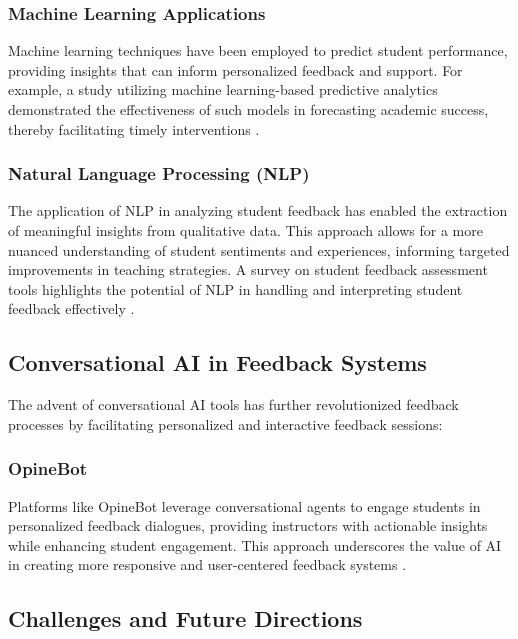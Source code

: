\documentclass[conference]{IEEEtran}
\begin{document}
\subsubsection{Machine Learning Applications}

Machine learning techniques have been employed to predict student performance, providing insights that can inform personalized feedback and support. For example, a study utilizing machine learning-based predictive analytics demonstrated the effectiveness of such models in forecasting academic success, thereby facilitating timely interventions \cite{8725237}.

\subsubsection{Natural Language Processing (NLP)}

The application of NLP in analyzing student feedback has enabled the extraction of meaningful insights from qualitative data. This approach allows for a more nuanced understanding of student sentiments and experiences, informing targeted improvements in teaching strategies. A survey on student feedback assessment tools highlights the potential of NLP in handling and interpreting student feedback effectively \cite{edalati2020potentialmachinelearningnlp}.

\subsection{Conversational AI in Feedback Systems}

The advent of conversational AI tools has further revolutionized feedback processes by facilitating personalized and interactive feedback sessions:

\subsubsection{OpineBot}

Platforms like OpineBot leverage conversational agents to engage students in personalized feedback dialogues, providing instructors with actionable insights while enhancing student engagement. This approach underscores the value of AI in creating more responsive and user-centered feedback systems \cite{tanwar2024opinebotclassfeedbackreimagined}.

\subsection{Challenges and Future Directions}
\end{document}
